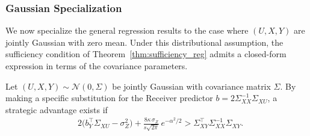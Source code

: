 \subsubsection{Gaussian Specialization}
\label{sec:gaussian}

We now specialize the general regression results to the case where $(U, X, Y)$ are jointly Gaussian with zero mean. Under this distributional assumption, the sufficiency condition of Theorem~\ref{thm:sufficiency_reg} admits a closed-form expression in terms of the covariance parameters.

\begin{theorem}
\label{thm:gaussian}
Let $(U, X, Y) \sim \mathcal{N}(0, \Sigma)$ be jointly Gaussian with covariance matrix $\Sigma$. By making a specific substitution for the Receiver predictor $b = 2\Sigma_{XX}^{-1}\Sigma_{XU}$, a strategic advantage exists if
\begin{align}
    &2\bigl(b_Y^\top \Sigma_{XU} - \sigma_Z^2\bigr) + \frac{8\kappa\,\sigma_Z}{s\sqrt{2\pi}}\, e^{-\alpha^2/2} > \Sigma_{XY}^\top \Sigma_{XX}^{-1} \Sigma_{XY}. \label{eq:gaussian_suff}
\end{align}
\end{theorem}